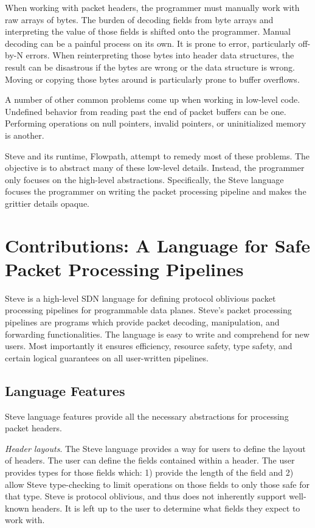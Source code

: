When working with packet headers, the programmer must manually work with raw arrays of bytes. The burden of decoding fields from byte arrays and interpreting the value of those fields is shifted onto the programmer. Manual decoding can be a painful process on its own. It is prone to error, particularly off-by-N errors. When reinterpreting those bytes into header data structures, the result can be disastrous if the bytes are wrong or the data structure is wrong. Moving or copying those bytes around is particularly prone to buffer overflows.

A number of other common problems come up when working in low-level code. Undefined behavior from reading past the end of packet buffers can be one. Performing operations on null pointers, invalid pointers, or uninitialized memory is another.

Steve and its runtime, Flowpath, attempt to remedy most of these problems. The objective is to abstract many of these low-level details. Instead, the programmer only focuses on the high-level abstractions. Specifically, the Steve language focuses the programmer on writing the packet processing pipeline and makes the grittier details opaque.

\section{Contributions: A Language for Safe Packet Processing Pipelines}

Steve is a high-level SDN language for defining protocol oblivious packet processing pipelines for programmable data planes. Steve's packet processing pipelines are programs which provide packet decoding, manipulation, and forwarding functionalities. The language is easy to write and comprehend for new users. Most importantly it ensures efficiency, resource safety, type safety, and certain logical guarantees on all user-written pipelines.

\subsection{Language Features}

Steve language features provide all the necessary abstractions for processing packet headers.

\emph{Header layouts}. The Steve language provides a way for users to define the layout of headers. The user can define the fields contained within a header. The user provides types for those fields which: 1) provide the length of the field and 2) allow Steve type-checking to limit operations on those fields to only those safe for that type. Steve is protocol oblivious, and thus does not inherently support well-known headers. It is left up to the user to determine what fields they expect to work with.

